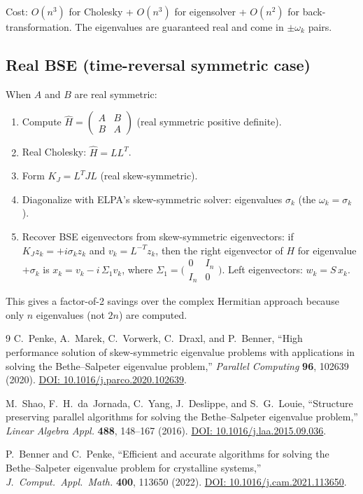 \documentclass[11pt]{article}
\newcommand{\bmat}[1]{\begin{pmatrix}#1\end{pmatrix}}
\newcommand{\Hhat}{\widehat{H}}
\begin{document}
Cost: $O(n^3)$ for Cholesky + $O(n^3)$ for eigensolver + $O(n^2)$ for
back-transformation.  The eigenvalues are guaranteed real and come in
$\pm\omega_k$ pairs.

\subsection{Real BSE (time-reversal symmetric case)}
When $A$ and $B$ are real symmetric:

\begin{enumerate}
  \item Compute $\Hhat = \bmat{A & B \\ B & A}$ (real symmetric
    positive definite).
  \item Real Cholesky: $\Hhat = L L^T$.
  \item Form $K_J = L^T J L$ (real skew-symmetric).
  \item Diagonalize with ELPA's skew-symmetric solver:
    eigenvalues $\sigma_k$ (the $\omega_k = \sigma_k$).
  \item Recover BSE eigenvectors from skew-symmetric eigenvectors:
    if $K_J z_k = +i\sigma_k z_k$ and $v_k = L^{-T} z_k$, then
    the right eigenvector of $H$ for eigenvalue $+\sigma_k$ is
    $x_k = v_k - i\,\Sigma_1 v_k$, where
    $\Sigma_1 = \bigl(\begin{smallmatrix}0 & I_n \\ I_n & 0\end{smallmatrix}\bigr)$.
    Left eigenvectors: $w_k = S\,x_k$.
\end{enumerate}

This gives a factor-of-2 savings over the complex Hermitian approach
because only $n$ eigenvalues (not $2n$) are computed.


\begin{thebibliography}{9}
  C.~Penke, A.~Marek, C.~Vorwerk, C.~Draxl, and P.~Benner,
  ``High performance solution of skew-symmetric eigenvalue problems
  with applications in solving the Bethe--Salpeter eigenvalue problem,''
  \emph{Parallel Computing} \textbf{96}, 102639 (2020).
  \href{https://doi.org/10.1016/j.parco.2020.102639}%
  {DOI: 10.1016/j.parco.2020.102639}.

  M.~Shao, F.~H.~da~Jornada, C.~Yang, J.~Deslippe, and S.~G.~Louie,
  ``Structure preserving parallel algorithms for solving the
  Bethe--Salpeter eigenvalue problem,''
  \emph{Linear Algebra Appl.} \textbf{488}, 148--167 (2016).
  \href{https://doi.org/10.1016/j.laa.2015.09.036}%
  {DOI: 10.1016/j.laa.2015.09.036}.

  P.~Benner and C.~Penke,
  ``Efficient and accurate algorithms for solving the Bethe--Salpeter
  eigenvalue problem for crystalline systems,''
  \emph{J.\ Comput.\ Appl.\ Math.} \textbf{400}, 113650 (2022).
  \href{https://doi.org/10.1016/j.cam.2021.113650}%
  {DOI: 10.1016/j.cam.2021.113650}.
\end{thebibliography}
\end{document}

